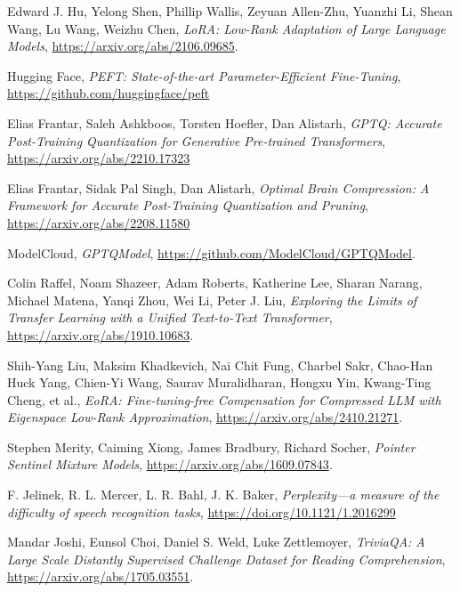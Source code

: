\begin{thebibliography}{9}
	Edward J. Hu, Yelong Shen, Phillip Wallis, Zeyuan Allen-Zhu, Yuanzhi Li, Shean Wang, Lu Wang, Weizhu Chen,
	\textit{LoRA: Low-Rank Adaptation of Large Language Models},
	\url{https://arxiv.org/abs/2106.09685}.

	Hugging Face,
	\textit{PEFT: State-of-the-art Parameter-Efficient Fine-Tuning},
	\url{https://github.com/huggingface/peft}

	Elias Frantar, Saleh Ashkboos, Torsten Hoefler, Dan Alistarh,
	\textit{GPTQ: Accurate Post-Training Quantization for Generative Pre-trained Transformers},
	\url{https://arxiv.org/abs/2210.17323}

	Elias Frantar, Sidak Pal Singh, Dan Alistarh,
	\textit{Optimal Brain Compression: A Framework for Accurate Post-Training Quantization and Pruning},
	\url{https://arxiv.org/abs/2208.11580}

	ModelCloud,
	\textit{GPTQModel},
	\url{https://github.com/ModelCloud/GPTQModel}.

	Colin Raffel, Noam Shazeer, Adam Roberts, Katherine Lee, Sharan Narang, Michael Matena, Yanqi Zhou, Wei Li, Peter J. Liu,
	\textit{Exploring the Limits of Transfer Learning with a Unified Text-to-Text Transformer},
	\url{https://arxiv.org/abs/1910.10683}.

	Shih-Yang Liu, Maksim Khadkevich, Nai Chit Fung, Charbel Sakr, Chao-Han Huck Yang, Chien-Yi Wang, Saurav Muralidharan, Hongxu Yin, Kwang-Ting Cheng, et al.,
	\textit{EoRA: Fine-tuning-free Compensation for Compressed LLM with Eigenspace Low-Rank Approximation},
	\url{https://arxiv.org/abs/2410.21271}.

	Stephen Merity, Caiming Xiong, James Bradbury, Richard Socher,
	\textit{Pointer Sentinel Mixture Models},
	\url{https://arxiv.org/abs/1609.07843}.

	F. Jelinek, R. L. Mercer, L. R. Bahl, J. K. Baker,
	\textit{Perplexity—a measure of the difficulty of speech recognition tasks},
	\url{https://doi.org/10.1121/1.2016299}

	Mandar Joshi, Eunsol Choi, Daniel S. Weld, Luke Zettlemoyer,
	\textit{TriviaQA: A Large Scale Distantly Supervised Challenge Dataset for Reading Comprehension},
	\url{https://arxiv.org/abs/1705.03551}.


\end{thebibliography}